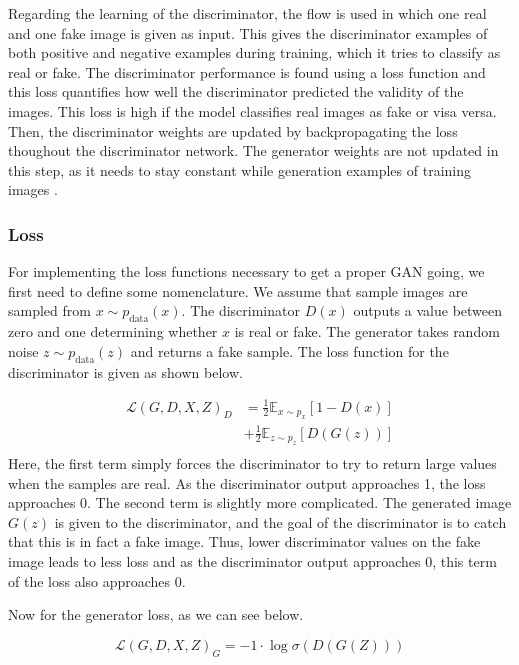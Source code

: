 \documentclass[12pt, fleqn, titlepage]{article}
\begin{document}
Regarding the learning of the discriminator, the flow is used in which one real and one fake image is given as input. This gives the discriminator examples of both positive and negative examples during training, which it tries to classify as real or fake. The discriminator performance is found using a loss function and this loss quantifies how well the discriminator predicted the validity of the images. This loss is high if the model classifies real images as fake or visa versa. Then, the discriminator weights are updated by backpropagating the loss thoughout the discriminator network. The generator weights are not updated in this step, as it needs to stay constant while generation examples of training images \cite{developers.google_discriminator, developers.google_training}.

\subsubsection{Loss}
For implementing the loss functions necessary to get a proper GAN going, we first need to define some nomenclature. We assume that sample images are sampled from $x \sim p_{\text {data}}(x)$. The discriminator $D(x)$ outputs a value between zero and one determining whether $x$ is real or fake. The generator takes random noise $z \sim p_{\text {data}}(z)$ and returns a fake sample. The loss function for the discriminator is given as shown below.

\[\begin{aligned}
	\mathcal{L}\left(G, D, X, Z\right)_D &=\frac{1}{2} \mathbb{E}_{x \sim p_{x}}[1-D(x)] \\
	&+\frac{1}{2} \mathbb{E}_{z \sim p_{z}}[D(G(z))] \\
\end{aligned}\]
Here, the first term simply forces the discriminator to try to return large values when the samples are real. As the discriminator output approaches 1, the loss approaches 0. The second term is slightly more complicated. The generated image $G(z)$ is given to the discriminator, and the goal of the discriminator is to catch that this is in fact a fake image. Thus, lower discriminator values on the fake image leads to less loss and as the discriminator output approaches 0, this term of the loss also approaches 0.

Now for the generator loss, as we can see below.

\[\mathcal{L}\left(G, D, X, Z\right)_G=-1 \cdot \log \sigma\left(D(G(Z))\right)\]
\end{document}
